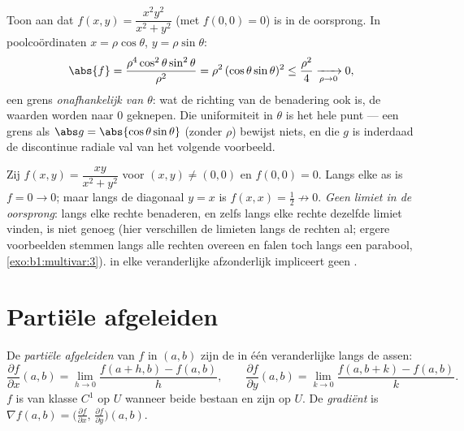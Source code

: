 \begin{example}
\label{ex:b1:multivar:polarbound}
Toon aan dat $f(x, y) = \dfrac{x^2y^2}{x^2 + y^2}$ (met $f(0,0) =
0$)  is in de oorsprong. In poolcoördinaten $x =
\rho\cos\theta$, $y = \rho\sin\theta$:
\[
\abs{f} = \frac{\rho^4\cos^2\theta\sin^2\theta}{\rho^2}
= \rho^2\,(\cos\theta\sin\theta)^2 \leq \frac{\rho^2}{4}
\xrightarrow[\rho \to 0]{} 0 ,
\]
een grens \emph{onafhankelijk van $\theta$}: wat de richting van
de benadering ook is, de waarden worden naar $0$ geknepen. Die
uniformiteit in $\theta$ is het hele punt --- een grens als
$\abs g = \abs{\cos\theta\sin\theta}$ (zonder $\rho$) bewijst
niets, en die $g$ is inderdaad de discontinue radiale val van het
volgende voorbeeld.
\end{example}

\begin{example}\label{ex:b1:multivar:trap}
Zij $f(x, y) = \dfrac{xy}{x^2 + y^2}$ voor $(x,y) \neq (0,0)$ en
$f(0, 0) = 0$. Langs elke as is $f = 0 \to 0$; maar langs de
diagonaal $y = x$ is $f(x, x) = \frac12 \not\to 0$. \emph{Geen
limiet in de oorsprong}: langs elke rechte benaderen, en zelfs
langs elke rechte dezelfde limiet vinden, is niet genoeg (hier
verschillen de limieten langs de rechten al; ergere voorbeelden
stemmen langs alle rechten overeen en falen toch langs een
parabool, \cref{exo:b1:multivar:3}).  in elke
veranderlijke afzonderlijk impliceert geen .
\end{example}

\section{Partiële afgeleiden}

\begin{definition}\label{def:b1:multivar:partial}
De \emph{partiële afgeleiden} van $f$ in
$(a, b)$ zijn de  in één veranderlijke langs de assen:
\[
\frac{\partial f}{\partial x}(a,b)
= \lim_{h \to 0} \frac{f(a + h, b) - f(a,b)}{h},
\qquad
\frac{\partial f}{\partial y}(a,b)
= \lim_{k \to 0} \frac{f(a, b + k) - f(a,b)}{k}.
\]
$f$ is van klasse $C^1$ op $U$ wanneer beide bestaan en  zijn
op $U$. De \emph{gradiënt} is $\nabla f(a,b) =
\bigl(\frac{\partial f}{\partial x},\, \frac{\partial f}{\partial
y}\bigr)(a,b)$.
\end{definition}


